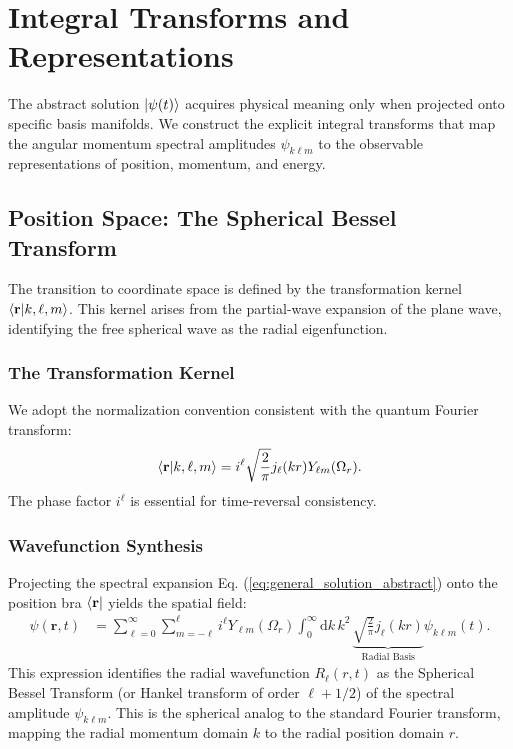 \section{Integral Transforms and Representations}

The abstract solution $\ket{\psi(t)}$ acquires physical meaning only when
projected onto specific basis manifolds. We construct the explicit integral
transforms that map the angular momentum spectral amplitudes $\psi_{k\ell m}$ to
the observable representations of position, momentum, and energy.

\subsection{Position Space: The Spherical Bessel Transform}

The transition to coordinate space is defined by the transformation kernel
$\braket{\mathbf{r} | k, \ell, m}$. This kernel arises from the partial-wave
expansion of the plane wave, identifying the free spherical wave as the radial
eigenfunction.

\subsubsection{The Transformation Kernel}
We adopt the normalization convention consistent with the quantum Fourier
transform:
\begin{equation} \label{eq:pos_kernel}
	\braket{\mathbf{r} | k, \ell, m} = i^\ell \sqrt{\frac{2}{\pi}} j_\ell(kr)
	Y_{\ell m}(\Omega_r).
\end{equation}
The phase factor $i^\ell$ is essential for time-reversal consistency.

\subsubsection{Wavefunction Synthesis}
Projecting the spectral expansion Eq. (\ref{eq:general_solution_abstract}) onto
the position bra $\bra{\mathbf{r}}$ yields the spatial field:
\begin{align}
	\psi(\mathbf{r}, t) &= \sum_{\ell=0}^\infty \sum_{m=-\ell}^\ell i^\ell
	Y_{\ell m}(\Omega_r) \int_0^\infty \mathrm{d}k \, k^2 \,
	\underbrace{\sqrt{\frac{2}{\pi}} j_\ell(kr)}_{\text{Radial Basis}}
	\psi_{k\ell m}(t).
\end{align}
This expression identifies the radial wavefunction $R_{\ell}(r, t)$ as the
Spherical Bessel Transform (or Hankel transform of order $\ell + 1/2$) of the
spectral amplitude $\psi_{k\ell m}$. This is the spherical analog to the
standard Fourier transform, mapping the radial momentum domain $k$ to the radial
position domain $r$.

